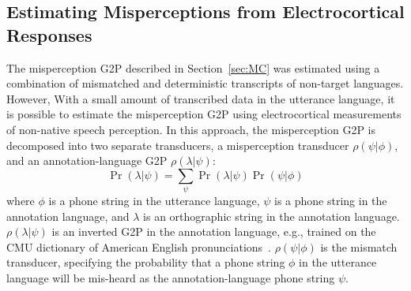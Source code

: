\subsection{Estimating Misperceptions from Electrocortical Responses}
\label{sec:eegchanmod}

The misperception G2P described in Section~\ref{sec:MC} was estimated
using a combination of mismatched and deterministic transcripts of
non-target languages. However, With a small amount
of transcribed data in the utterance language, it is possible
to estimate the misperception G2P using electrocortical measurements
of non-native speech perception. In this approach, the misperception G2P
is decomposed into two separate transducers,
a misperception transducer $\rho(\psi|\phi)$, and an
annotation-language G2P $\rho(\lambda|\psi)$:
\begin{equation}
  \Pr(\lambda|\psi)=\sum_{\psi}\Pr(\lambda|\psi)\Pr(\psi|\phi)
\end{equation}
where $\phi$ is a phone string in the utterance language, $\psi$ is a
phone string in the annotation language, and $\lambda$ is an
orthographic string in the annotation language.  $\rho(\lambda|\psi)$
is an inverted G2P in the annotation language, e.g., trained on the
CMU dictionary of American English pronunciations~\cite{Lenzo1995}.
$\rho(\psi|\phi)$ is the mismatch transducer, specifying the
probability that a phone string $\phi$ in the utterance language will
be mis-heard as the annotation-language phone string $\psi$. 

